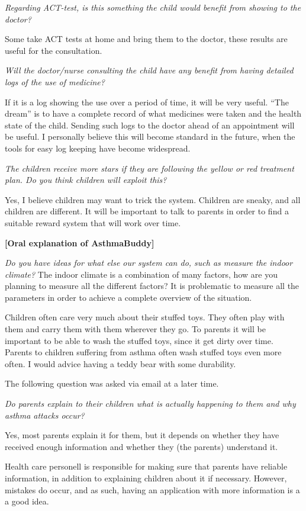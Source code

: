 \emph{Regarding ACT-test, is this something the child would benefit from showing to the doctor?}

Some take ACT tests at home and bring them to the doctor, these results are useful for the consultation.

\emph{Will the doctor/nurse consulting the child have any benefit from having detailed logs of the use of medicine?}

If it is a log showing the use over a period of time, it will be very useful. ``The dream'' is to have a complete record of what medicines were taken and the health state of the child. Sending such logs to the doctor ahead of an appointment will be useful. I personally believe this will become standard in the future, when the tools for easy log keeping have become widespread.

\emph{The children receive more stars if they are following the yellow or red treatment plan. Do you think children will exploit this?} 

Yes, I believe children may want to trick the system. Children are sneaky, and all children are different. It will be important to talk to parents in order to find a suitable reward system that will work over time. 

\textbf{[Oral explanation of AsthmaBuddy]}

\emph{Do you have ideas for what else our system can do, such as measure the indoor climate?}
The indoor climate is a combination of many factors, how are you planning to measure all the different factors? It is problematic to measure all the parameters in order to achieve a complete overview of the situation. 

Children often care very much about their stuffed toys. They often play with them and carry them with them wherever they go. To parents it will be important to be able to wash the stuffed toys, since it get dirty over time. Parents to children suffering from asthma often wash stuffed toys even more often. I would advice having a teddy bear with some durability.

The following question was asked via email at a later time.

\emph{Do parents explain to their children what is actually happening to them and why asthma attacks occur?}

Yes, most parents explain it for them, but it depends on whether they have received enough information and whether they (the parents) understand it.

Health care personell is responsible for making sure that parents have reliable information, in addition to explaining children about it if necessary. However, mistakes do occur, and as such, having an application with more information is a a good idea.   
